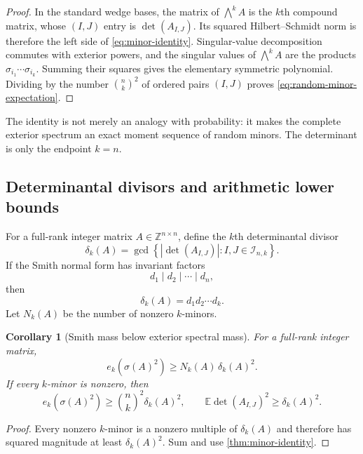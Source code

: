 \documentclass[11pt,oneside]{article}
\newtheorem{corollary}[theorem]{Corollary}
\theoremstyle{definition}
\theoremstyle{remark}
\newcommand{\Z}{\mathbb{Z}}
\newcommand{\E}{\mathbb{E}}
\newcommand{\abs}[1]{\left\lvert #1\right\rvert}
\newcommand{\set}[1]{\left\{#1\right\}}
\begin{document}
\begin{proof}
In the standard wedge bases, the matrix of $\bigwedge^kA$ is the $k$th compound matrix, whose $(I,J)$ entry is $\det(A_{I,J})$.  Its squared Hilbert--Schmidt norm is therefore the left side of \eqref{eq:minor-identity}.  Singular-value decomposition commutes with exterior powers, and the singular values of $\bigwedge^kA$ are the products $\sigma_{i_1}\cdots\sigma_{i_k}$.  Summing their squares gives the elementary symmetric polynomial.  Dividing by the number $\binom nk^2$ of ordered pairs $(I,J)$ proves \eqref{eq:random-minor-expectation}.
\end{proof}

The identity is not merely an analogy with probability: it makes the complete exterior spectrum an exact moment sequence of random minors.  The determinant is only the endpoint $k=n$.

\subsection{Determinantal divisors and arithmetic lower bounds}

For a full-rank integer matrix $A\in\Z^{n\times n}$, define the $k$th determinantal divisor
\begin{equation}
 \delta_k(A)=\gcd\set{\abs{\det(A_{I,J})}:I,J\in\mathcal I_{n,k}}.
 \label{eq:det-divisor}
\end{equation}
If the Smith normal form has invariant factors
\[
 d_1\mid d_2\mid\cdots\mid d_n,
\]
then
\begin{equation}
 \delta_k(A)=d_1d_2\cdots d_k.
 \label{eq:delta-SNF}
\end{equation}
Let $N_k(A)$ be the number of nonzero $k$-minors.

\begin{corollary}[Smith mass below exterior spectral mass]
\label{cor:smith-exterior}
For a full-rank integer matrix,
\begin{equation}
 e_k(\sigma(A)^2)\ge N_k(A)\,\delta_k(A)^2.
 \label{eq:smith-exterior}
\end{equation}
If every $k$-minor is nonzero, then
\begin{equation}
 e_k(\sigma(A)^2)\ge\binom nk^2\delta_k(A)^2,
 \qquad
 \E\det(A_{I,J})^2\ge\delta_k(A)^2.
 \label{eq:all-minors-smith}
\end{equation}
\end{corollary}

\begin{proof}
Every nonzero $k$-minor is a nonzero multiple of $\delta_k(A)$ and therefore has squared magnitude at least $\delta_k(A)^2$.  Sum and use \cref{thm:minor-identity}.
\end{proof}
\end{document}
